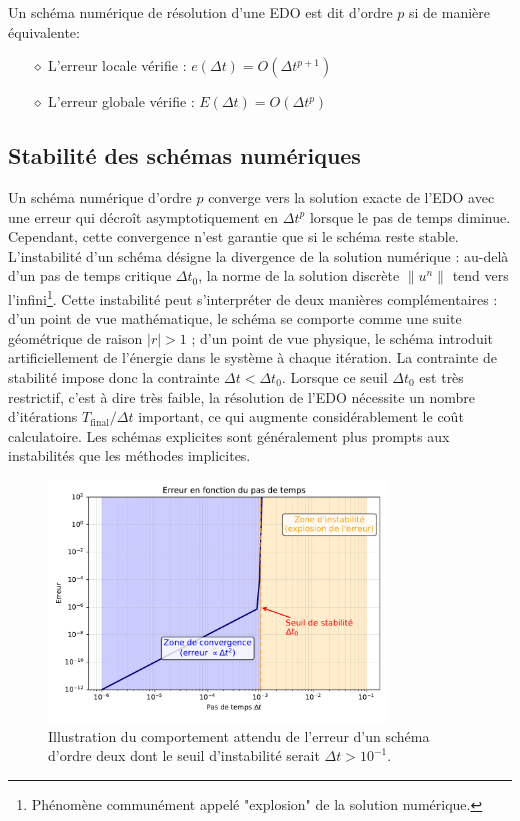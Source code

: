 \begin{definition}
    Un schéma numérique de résolution d'une EDO est dit d'ordre $p$ si de manière équivalente:
    \begin{itemize}
        \item[$\diamond$] L'erreur locale vérifie : $e(\Delta t) = O(\Delta t^{p+1})$
        \item[$\diamond$] L'erreur globale vérifie : $E(\Delta t) = O(\Delta t^{p})$
    \end{itemize}
\end{definition}

\subsection{Stabilité des schémas numériques}\label{par:stabilite_edo}
Un schéma numérique d'ordre $p$ converge vers la solution exacte de l'EDO avec une erreur qui décroît asymptotiquement en $\Delta t^p$ lorsque le pas de temps diminue.
Cependant, cette convergence n'est garantie que si le schéma reste stable.
L'instabilité d'un schéma désigne la divergence de la solution numérique : au-delà d'un pas de temps critique $\Delta t_0$, la norme de la solution discrète $\|u^n\|$ tend vers l'infini\footnote{Phénomène communément appelé "explosion" de la solution numérique.}.
Cette instabilité peut s'interpréter de deux manières complémentaires : d'un point de vue mathématique, le schéma se comporte comme une suite géométrique de raison $|r| > 1$ ; 
d'un point de vue physique, le schéma introduit artificiellement de l'énergie dans le système à chaque itération.
La contrainte de stabilité impose donc la contrainte $\Delta t < \Delta t_0$. 
Lorsque ce seuil $\Delta t_0$ est très restrictif, c'est à dire très faible, la résolution de l'EDO nécessite un nombre d'itérations $T_{\text{final}}/\Delta t$ important,
ce qui augmente considérablement le coût calculatoire. 
Les schémas explicites sont généralement plus prompts aux instabilités que les méthodes implicites.
\begin{figure}[htbp]
    \centering
    \includegraphics[width=0.8\textwidth]{media/3_/2_/exemple_satabilite.pdf}
    \caption{Illustration du comportement attendu de l'erreur d'un schéma d'ordre deux dont le seuil d'instabilité serait $\Delta t > 10^{-1}$.}
    \label{fig:stabilite_schema}
\end{figure}
